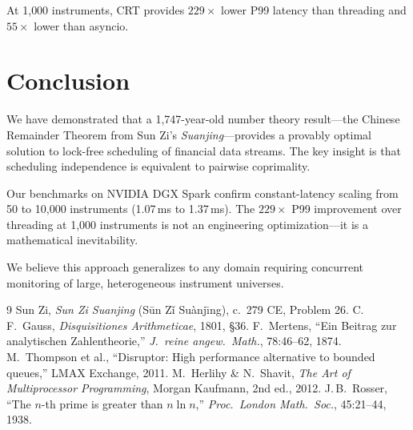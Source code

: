\documentclass[11pt,a4paper]{article}
\begin{document}
At 1{,}000 instruments, CRT provides $229\times$ lower P99 latency than threading and $55\times$ lower than asyncio.

\section{Conclusion}

We have demonstrated that a 1{,}747-year-old number theory result---the Chinese Remainder Theorem from Sun Zi's \emph{Suanjing}---provides a provably optimal solution to lock-free scheduling of financial data streams. The key insight is that scheduling independence is equivalent to pairwise coprimality.

Our benchmarks on NVIDIA DGX Spark confirm constant-latency scaling from 50 to 10{,}000 instruments (1.07\,ms to 1.37\,ms). The $229\times$ P99 improvement over threading at 1{,}000 instruments is not an engineering optimization---it is a mathematical inevitability.

We believe this approach generalizes to any domain requiring concurrent monitoring of large, heterogeneous instrument universes.

\begin{thebibliography}{9}
 Sun Zi, \emph{Sun Zi Suanjing} (S\={u}n Z\v{i} Su\`{a}nj\={\i}ng), c.\ 279 CE, Problem 26.
 C.\,F.\ Gauss, \emph{Disquisitiones Arithmeticae}, 1801, \S36.
 F.\ Mertens, ``Ein Beitrag zur analytischen Zahlentheorie,'' \emph{J.\ reine angew.\ Math.}, 78:46--62, 1874.
 M.\ Thompson et al., ``Disruptor: High performance alternative to bounded queues,'' LMAX Exchange, 2011.
 M.\ Herlihy \& N.\ Shavit, \emph{The Art of Multiprocessor Programming}, Morgan Kaufmann, 2nd ed., 2012.
 J.\,B.\ Rosser, ``The $n$-th prime is greater than $n \ln n$,'' \emph{Proc.\ London Math.\ Soc.}, 45:21--44, 1938.
\end{thebibliography}
\end{document}
